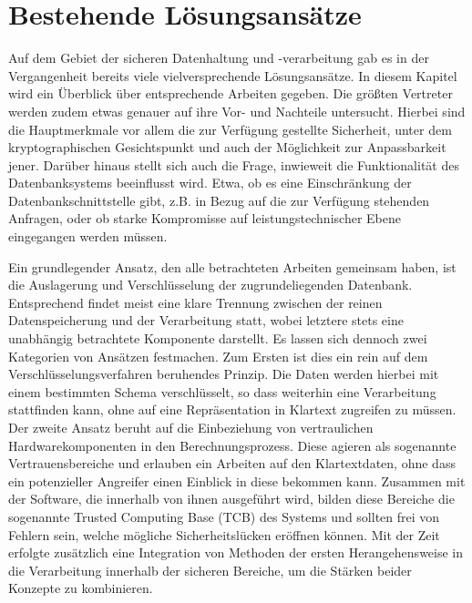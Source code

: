 \section{Bestehende Lösungsansätze}
Auf dem Gebiet der sicheren Datenhaltung und -verarbeitung gab es in der Vergangenheit bereits viele vielversprechende Lösungsansätze. In diesem Kapitel wird ein Überblick über entsprechende Arbeiten gegeben. Die größten Vertreter werden zudem etwas genauer auf ihre Vor- und Nachteile untersucht. Hierbei sind die Hauptmerkmale vor allem die zur Verfügung gestellte Sicherheit, unter dem kryptographischen Gesichtspunkt und auch der Möglichkeit zur Anpassbarkeit jener. Darüber hinaus stellt sich auch die Frage, inwieweit die Funktionalität des Datenbanksystems beeinflusst wird. Etwa, ob es eine Einschränkung der Datenbankschnittstelle gibt, z.B. in Bezug auf die zur Verfügung stehenden Anfragen, oder ob starke Kompromisse auf leistungstechnischer Ebene eingegangen werden müssen.

Ein grundlegender Ansatz, den alle betrachteten Arbeiten gemeinsam haben, ist die Auslagerung und Verschlüsselung der zugrundeliegenden Datenbank. Entsprechend findet meist eine klare Trennung zwischen der reinen Datenspeicherung und der Verarbeitung statt, wobei letztere stets eine unabhängig betrachtete Komponente darstellt. Es lassen sich dennoch zwei Kategorien von Ansätzen festmachen. Zum Ersten ist dies ein rein auf dem Verschlüsselungsverfahren beruhendes Prinzip. Die Daten werden hierbei mit einem bestimmten Schema verschlüsselt, so dass weiterhin eine Verarbeitung stattfinden kann, ohne auf eine Repräsentation in Klartext zugreifen zu müssen. Der zweite Ansatz beruht auf die Einbeziehung von vertraulichen Hardwarekomponenten in den Berechnungsprozess. Diese agieren als sogenannte Vertrauensbereiche und erlauben ein Arbeiten auf den Klartextdaten, ohne dass ein potenzieller Angreifer einen Einblick in diese bekommen kann. Zusammen mit der Software, die innerhalb von ihnen ausgeführt wird, bilden diese Bereiche die sogenannte Trusted Computing Base (TCB) des Systems und sollten frei von Fehlern sein, welche mögliche Sicherheitslücken eröffnen können. Mit der Zeit erfolgte zusätzlich eine Integration von Methoden der ersten Herangehensweise in die Verarbeitung innerhalb der sicheren Bereiche, um die Stärken beider Konzepte zu kombinieren.

